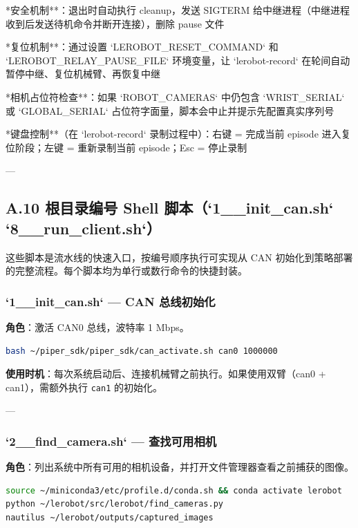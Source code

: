 \documentclass[UTF8,a4paper,11pt]{ctexart}
\begin{document}
{\item **安全机制**：退出时自动执行 cleanup，发送 SIGTERM 给中继进程（中继进程收到后发送待机命令并断开连接），删除 pause 文件
\item **复位机制**：通过设置 `LEROBOT_RESET_COMMAND` 和 `LEROBOT_RELAY_PAUSE_FILE` 环境变量，让 `lerobot-record` 在轮间自动暂停中继、复位机械臂、再恢复中继
\item **相机占位符检查**：如果 `ROBOT_CAMERAS` 中仍包含 `WRIST_SERIAL` 或 `GLOBAL_SERIAL` 占位符字面量，脚本会中止并提示先配置真实序列号
\item **键盘控制**（在 `lerobot-record` 录制过程中）：右键 = 完成当前 episode 进入复位阶段；左键 = 重新录制当前 episode；Esc = 停止录制

---

\subsection{A.10 根目录编号 Shell 脚本（`1__init_can.sh` ~ `8__run_client.sh`）}

这些脚本是流水线的快速入口，按编号顺序执行可实现从 CAN 初始化到策略部署的完整流程。每个脚本均为单行或数行命令的快捷封装。

\subsubsection{`1__init_can.sh` — CAN 总线初始化}

\textbf{角色}：激活 CAN0 总线，波特率 1 Mbps。

\begin{lstlisting}[language=bash]
bash ~/piper_sdk/piper_sdk/can_activate.sh can0 1000000
\end{lstlisting}

\textbf{使用时机}：每次系统启动后、连接机械臂之前执行。如果使用双臂（can0 + can1），需额外执行 \texttt{can1} 的初始化。

---

\subsubsection{`2__find_camera.sh` — 查找可用相机}

\textbf{角色}：列出系统中所有可用的相机设备，并打开文件管理器查看之前捕获的图像。

\begin{lstlisting}[language=bash]
source ~/miniconda3/etc/profile.d/conda.sh && conda activate lerobot
python ~/lerobot/src/lerobot/find_cameras.py
nautilus ~/lerobot/outputs/captured_images
\end{lstlisting}

}
\end{document}
